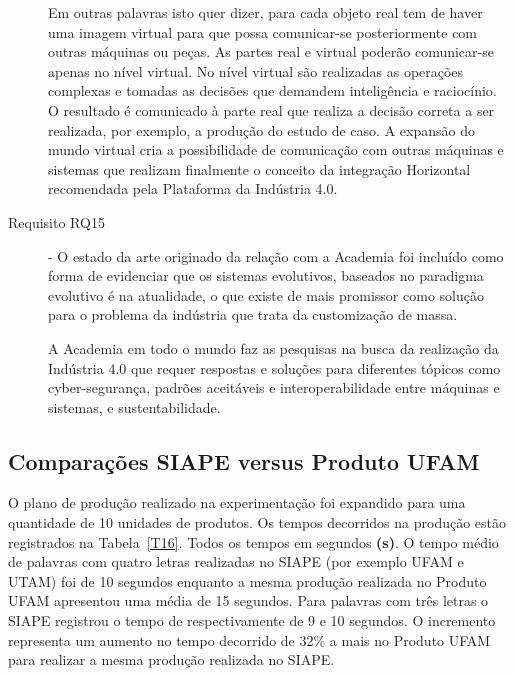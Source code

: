\documentclass[10pt,letterpaper,twocolumn]{IEEEtran}
\begin{document}
\begin{description}
	Em outras palavras isto quer dizer, para cada objeto real tem de haver uma imagem virtual para que possa comunicar-se posteriormente com outras máquinas ou peças. As partes real e virtual poderão comunicar-se apenas no nível virtual. No nível virtual são realizadas as operações complexas e tomadas as decisões que demandem inteligência e raciocínio. O resultado é comunicado à parte real que realiza a decisão correta a ser realizada, por exemplo, a produção do estudo de caso. A expansão do mundo virtual cria a possibilidade de comunicação com outras máquinas e sistemas que realizam finalmente o conceito da integração Horizontal recomendada pela Plataforma da Indústria 4.0.
	
	\item[Requisito RQ15] - O estado da arte originado da relação com a Academia foi incluído como forma de evidenciar que os sistemas evolutivos, baseados no paradigma evolutivo é na atualidade, o que existe de mais promissor como solução para o problema da indústria que trata da customização de massa.
	
	A Academia em todo o mundo faz as pesquisas na busca da realização da Indústria 4.0 que requer respostas e soluções para diferentes tópicos como cyber-segurança, padrões aceitáveis e interoperabilidade entre máquinas e sistemas, e sustentabilidade. 
	
\end{description}	



\subsection{Comparações SIAPE versus Produto UFAM}

O plano de produção realizado na experimentação foi expandido para uma quantidade de 10 unidades de produtos. Os tempos decorridos na produção estão registrados na Tabela~\ref{T16}. Todos os tempos em segundos \textbf{(s)}. O tempo médio de palavras com quatro letras realizadas no SIAPE (por exemplo UFAM e UTAM) foi de 10 segundos enquanto a mesma produção realizada no Produto UFAM apresentou uma média de 15 segundos. Para palavras com três letras o SIAPE registrou o tempo de respectivamente de 9 e 10 segundos. O incremento representa um aumento no tempo decorrido de 32\% a mais no Produto UFAM para realizar a mesma produção realizada no SIAPE.
\end{document}
